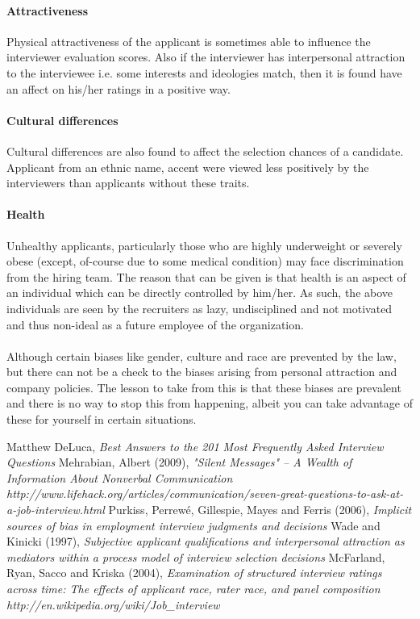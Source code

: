 \documentclass[a4paper,12pt]{report}
\begin{document}
\paragraph{Attractiveness}
Physical attractiveness of the applicant is sometimes able to influence the interviewer evaluation scores.
Also if the interviewer has interpersonal attraction\cite{interpersonal} to the interviewee i.e. some interests and ideologies match,
then it is found have an affect on his/her ratings in a positive way.
\paragraph{Cultural differences}
Cultural differences are also found to affect the selection chances of a candidate\cite{bias}. Applicant from 
an ethnic name, accent were viewed less positively by the interviewers than applicants without these traits.
\paragraph{Health}
Unhealthy applicants, particularly those who are highly underweight or severely obese (except, of-course due to some medical condition)
may face discrimination from the hiring team. The reason that can be given is that health is an aspect of an individual
 which can be directly controlled by him/her. As such, the above individuals are seen by the recruiters as lazy, undisciplined and
not motivated and thus non-ideal as a future employee of the organization.
\paragraph{}
Although certain biases like gender, culture and race are prevented by the law, but there can not be a check to the biases
arising from personal attraction and company policies.
The lesson to take from this is that these biases are prevalent and there is no way to stop this from happening,
albeit you can take advantage of these for yourself in certain situations.

\begin{thebibliography}{9}
  Matthew DeLuca,
  \emph{Best Answers to the 201 Most Frequently Asked Interview Questions}
  Mehrabian, Albert (2009),
  \emph{"Silent Messages" – A Wealth of Information About Nonverbal Communication}
  \emph{http://www.lifehack.org/articles/communication/seven-great-questions-to-ask-at-a-job-interview.html}
  Purkiss, Perrewé, Gillespie, Mayes and Ferris (2006),
  \emph{Implicit sources of bias in employment interview judgments and decisions}
  Wade and Kinicki (1997),
  \emph{Subjective applicant qualifications and interpersonal attraction as mediators within a process model of interview selection decisions}
  McFarland, Ryan, Sacco and Kriska (2004),
  \emph{Examination of structured interview ratings across time: The effects of applicant race, rater race, and panel composition}
  \emph{http://en.wikipedia.org/wiki/Job\_interview}
\end{thebibliography}

\printindex
\end{document}

